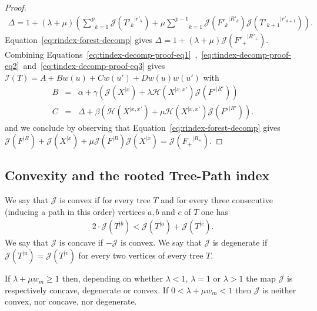 \documentclass[11 pt]{modarticle}
\newcommand{\wmap}{w}
\newcommand{\wmin}{w_m}
\newcommand{\rtree}[2]{{#1}^{\lvert #2}}
\newcommand{\indexsymbol}{\mathcal{I}}
\newcommand{\tindex}[1]{\indexsymbol(#1)}
\newcommand{\rindexsymbol}{\mathcal{J}}
\newcommand{\rindex}[2]{\rindexsymbol(\rtree{#2}{#1})}
\newcommand{\aindexsymbol}{\mathcal{H}}
\newcommand{\aindex}[3]{\aindexsymbol(\rtree{#3}{#1, #2})}
\begin{document}
\begin{proof}
\begin{eqnarray*}
	\Delta = 1 + (\lambda + \mu) \left(\underset{k=1}{\overset{p}{\sum}} \rindex{r'_k}{T'_k} + \mu \underset{k=1}{\overset{p-1}{\sum}} \rindex{R'_k}{F'_k} \rindex{r'_{k+1}}{T'_{k+1}}\right).
\end{eqnarray*}
Equation~\eqref{eq:rindex-forest-decomp} gives $\Delta = 1 + (\lambda + \mu) \rindex{R'_+}{F'_+}$. Combining Equations~\eqref{eq:tindex-decomp-proof-eq1}~,~\eqref{eq:tindex-decomp-proof-eq2}~and~\eqref{eq:tindex-decomp-proof-eq3} gives $\tindex{T} = A + B \wmap(u) + C \wmap(u') + D \wmap(u) \wmap(u')$ with
\begin{eqnarray*}
	B & = & \alpha + \gamma\left(\rindex{x}{X} + \lambda \aindex{x}{x'}{X} \rindex{R'}{F'}\right) \\
	C & = &  \Delta + \beta\left(\aindex{x}{x'}{X} + \mu \aindex{x}{x'}{X} \rindex{R'}{F'}\right).
\end{eqnarray*}
and we conclude by observing that Equation~\eqref{eq:rindex-forest-decomp} gives $\rindex{R}{F} + \rindex{x}{X} + \mu \rindex{R}{F} \rindex{x}{X} = \rindex{R_+}{F_+}$.
\end{proof}


\subsection{Convexity and the rooted Tree-Path index}

\begin{defi}
We say that $\rindexsymbol$ is convex if for every tree $T$ and for every three consecutive (inducing a path in this order) vertices $a,b$ and $c$ of $T$ one has
\begin{eqnarray*}
	2 \cdot \rindex{b}{T} < \rindex{a}{T} + \rindex{c}{T}.
\end{eqnarray*}
We say that $\rindexsymbol$ is concave if ${-\rindexsymbol}$ is convex. We say that $\rindexsymbol$ is degenerate if $\rindex{u}{T} = \rindex{v}{T}$ for every two vertices of every tree $T$. 
\end{defi}

\begin{prop}\label{prop:convexity}
If $\lambda + \mu \wmin \geq 1$ then, depending on whether $\lambda < 1$, $\lambda = 1$ or $\lambda > 1$ the map $\rindexsymbol$ is respectively concave, degenerate or convex. If $0 < \lambda + \mu \wmin < 1$ then $\rindexsymbol$ is neither convex, nor concave, nor degenerate.
\end{prop}
\end{document}

